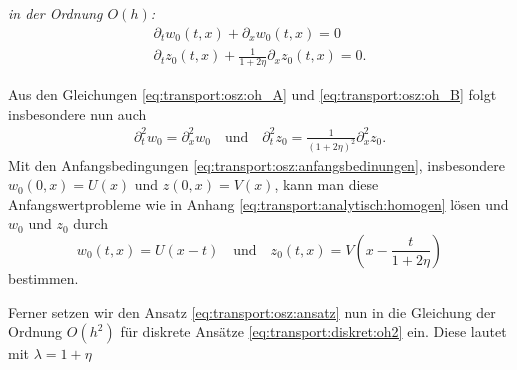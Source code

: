 \noindent \emph{in der Ordnung $O(h)$:}
\begin{align}
\partial_t w_0(t, x) + \partial_x w_0(t, x) = 0 \label{eq:transport:osz:oh_A}\\
\partial_t z_0(t, x) + \frac {1} {1 + 2\eta} \partial_x z_0(t, x) = 0 \label{eq:transport:osz:oh_B}.
\end{align}

Aus den Gleichungen \eqref{eq:transport:osz:oh_A} und \eqref{eq:transport:osz:oh_B} folgt insbesondere nun auch
\begin{align}\label{alt:abl2}
\partial^2_t w_0 = \partial^2_x w_0 \quad \text{und} \quad \partial^2_t z_0 = \frac {1}{(1 + 2 \eta)^2} \partial^2_x z_0.
\end{align}
Mit den Anfangsbedingungen \eqref{eq:transport:osz:anfangsbedinungen}, insbesondere $w_0(0, x) = U(x)$ und $z(0, x) = V(x)$, kann man diese Anfangswertprobleme wie in Anhang \ref{eq:transport:analytisch:homogen} lösen und $w_0$ und $z_0$ durch
\[ w_0(t,x) = U(x-t) \quad \text{und} \quad z_0(t,x) = V\left( x - \frac{t}{1 + 2 \eta} \right) \]
bestimmen.

Ferner setzen wir den Ansatz \eqref{eq:transport:osz:ansatz} nun in die Gleichung der Ordnung $O(h^2)$ für diskrete Ansätze \eqref{eq:transport:diskret:oh2} ein.
Diese lautet mit $\lambda = 1 + \eta$

